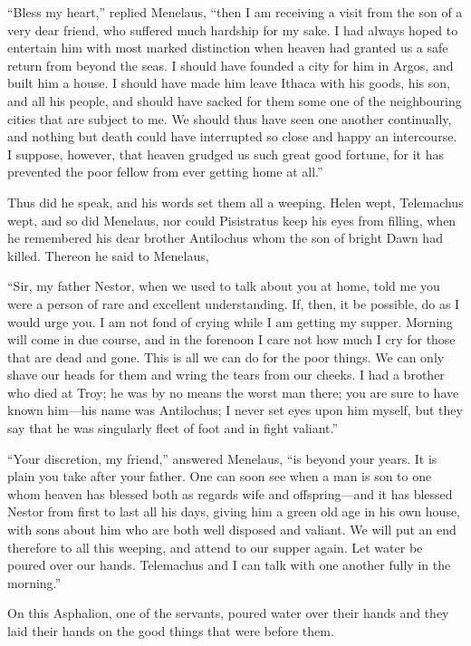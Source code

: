 “Bless my heart,” replied Menelaus, “then I am receiving a visit from the son
of a very dear friend, who suffered much hardship for my sake. I had always
hoped to entertain him with most marked distinction when heaven had granted us
a safe return from beyond the seas. I should have founded a city for him in
Argos, and built him a house. I should have made him leave Ithaca with his
goods, his son, and all his people, and should have sacked for them some one of
the neighbouring cities that are subject to me. We should thus have seen one
another continually, and nothing but death could have interrupted so close and
happy an intercourse. I suppose, however, that heaven grudged us such great
good fortune, for it has prevented the poor fellow from ever getting home at
all.”

Thus did he speak, and his words set them all a weeping. Helen wept, Telemachus
wept, and so did Menelaus, nor could Pisistratus keep his eyes from filling,
when he remembered his dear brother Antilochus whom the son of bright Dawn had
killed. Thereon he said to Menelaus,

“Sir, my father Nestor, when we used to talk about you at home, told me you
were a person of rare and excellent understanding. If, then, it be possible, do
as I would urge you. I am not fond of crying while I am getting my supper.
Morning will come in due course, and in the forenoon I care not how much I cry
for those that are dead and gone. This is all we can do for the poor things. We
can only shave our heads for them and wring the tears from our cheeks. I had a
brother who died at Troy; he was by no means the worst man there; you are sure
to have known him—his name was Antilochus; I never set eyes upon him myself,
but they say that he was singularly fleet of foot and in fight valiant.”

“Your discretion, my friend,” answered Menelaus, “is beyond your years. It is
plain you take after your father. One can soon see when a man is son to one
whom heaven has blessed both as regards wife and offspring—and it has blessed
Nestor from first to last all his days, giving him a green old age in his own
house, with sons about him who are both well disposed and valiant. We will put
an end therefore to all this weeping, and attend to our supper again. Let water
be poured over our hands. Telemachus and I can talk with one another fully in
the morning.”

On this Asphalion, one of the servants, poured water over their hands and they
laid their hands on the good things that were before them.

